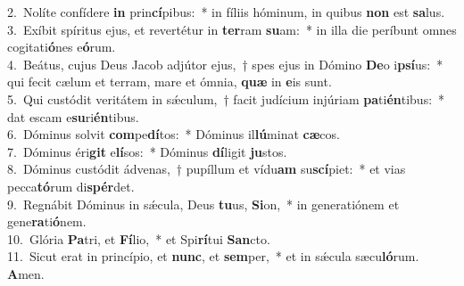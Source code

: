 {2.~}Nolíte confídere \textbf{in} prin\textbf{cí}pibus:~* in fíliis hóminum, in quibus \textbf{non} est \textbf{sa}lus.\\
{3.~}Exíbit spíritus ejus, et revertétur in \textbf{ter}ram \textbf{su}am:~* in illa die períbunt omnes cogitati\textbf{ó}nes e\textbf{ó}rum.\\
{4.~}Beátus, cujus Deus Jacob adjútor ejus,~† spes ejus in Dómino \textbf{De}o i\textbf{psí}us:~* qui fecit cælum et terram, mare et ómnia, \textbf{quæ} in \textbf{e}is sunt.\\
{5.~}Qui custódit veritátem in sǽculum,~† facit judícium injúriam \textbf{pa}ti\textbf{én}tibus:~* dat escam e\textbf{su}ri\textbf{én}tibus.\\
{6.~}Dóminus solvit \textbf{com}pe\textbf{dí}tos:~* Dóminus il\textbf{lú}minat \textbf{cæ}cos.\\
{7.~}Dóminus éri\textbf{git} e\textbf{lí}sos:~* Dóminus \textbf{dí}ligit \textbf{ju}stos.\\
{8.~}Dóminus custódit ádvenas,~† pupíllum et vídu\textbf{am} su\textbf{scí}piet:~* et vias pecca\textbf{tó}rum di\textbf{spér}det.\\
{9.~}Regnábit Dóminus in sǽcula, Deus \textbf{tu}us, \textbf{Si}on,~* in generatiónem et gene\textbf{ra}ti\textbf{ó}nem.\\
{10.~}Glória \textbf{Pa}tri, et \textbf{Fí}lio,~* et Spi\textbf{rí}tui \textbf{San}cto.\\
{11.~}Sicut erat in princípio, et \textbf{nunc}, et \textbf{sem}per,~* et in sǽcula sæcu\textbf{ló}rum. \textbf{A}men.\\
